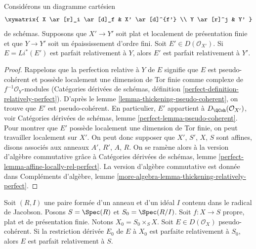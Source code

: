 \begin{lemma}
\label{lemma-thickening-relatively-perfect}
Considérons un diagramme cartésien
$$
\xymatrix{
X \ar[r]_i \ar[d]_f & X' \ar[d]^{f'} \\
Y \ar[r]^j & Y'
}
$$
de schémas. Supposons que $X' \to Y'$ soit plat et localement
de présentation finie et que $Y \to Y'$ soit un épaississement d'ordre fini.
Soit $E' \in D(\mathcal{O}_{X'})$. Si $E = Li^*(E')$ est parfait relativement à $Y$,
alors $E'$ est parfait relativement à $Y'$.
\end{lemma}

\begin{proof}
Rappelons que la perfection relative à $Y$ de $E$ signifie que $E$ est
pseudo-cohérent et possède localement une dimension de Tor finie comme complexe
de $f^{-1}\mathcal{O}_Y$-modules
(Catégories dérivées de schémas,
définition \ref{perfect-definition-relatively-perfect}).
D'après le lemme \ref{lemma-thickening-pseudo-coherent},
on trouve que $E'$ est pseudo-cohérent.
En particulier, $E'$ appartient à $D_\QCoh(\mathcal{O}_{X'})$, voir
Catégories dérivées de schémas, lemme \ref{perfect-lemma-pseudo-coherent}.
Pour montrer que $E'$ possède localement une dimension de Tor finie,
on peut travailler localement sur $X'$. On peut donc supposer que
$X'$, $S'$, $X$, $S$ sont affines, disons associés aux
anneaux $A'$, $R'$, $A$, $R$.
On se ramène alors à la version d'algèbre commutative grâce à
Catégories dérivées de schémas,
lemme \ref{perfect-lemma-affine-locally-rel-perfect}.
La version d'algèbre commutative est donnée dans Compléments d'algèbre, lemme
\ref{more-algebra-lemma-thickening-relatively-perfect}.
\end{proof}

\begin{lemma}
\label{lemma-henselian-relatively-perfect}
Soit $(R, I)$ une paire formée d'un anneau et d'un idéal $I$
contenu dans le radical de Jacobson. Posons $S = \Spec(R)$ et $S_0 = \Spec(R/I)$.
Soit $f : X \to S$ propre, plat et de présentation finie.
Notons $X_0 = S_0 \times_S X$. Soit $E \in D(\mathcal{O}_X)$
pseudo-cohérent. Si la restriction dérivée $E_0$ de $E$
à $X_0$ est parfaite relativement à $S_0$, alors $E$ est parfait relativement à $S$.
\end{lemma}

